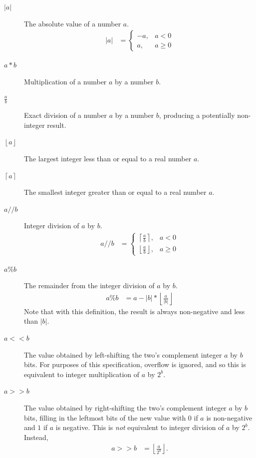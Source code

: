 \documentclass[9pt,letterpaper]{book}
\numberwithin{equation}{chapter}
\numberwithin{figure}{chapter}
\numberwithin{table}{chapter}
\begin{document}
\begin{description}
\item[$|a|$]
The absolute value of a number $a$.
\begin{align*}
|a| & = \left\{\begin{array}{ll}
-a, & a < 0 \\
a, & a \ge 0
\end{array}\right.
\end{align*}

\item[$a*b$]
Multiplication of a number $a$ by a number $b$.
\item[$\frac{a}{b}$]
Exact division of a number $a$ by a number $b$, producing a potentially
 non-integer result.

\item[$\left\lfloor a\right\rfloor$] 
The largest integer less than or equal to a real number $a$.

\item[$\left\lceil a\right\rceil$]
The smallest integer greater than or equal to a real number $a$.

\item[$a//b$]
Integer division of $a$ by $b$.
\begin{align*}
a//b & = \left\{\begin{array}{ll}
\left\lceil\frac{a}{b}\right\rceil, & a < 0 \\
\left\lfloor\frac{a}{b}\right\rfloor, & a \ge 0
\end{array}\right.
\end{align*}

\item[$a\%b$]
The remainder from the integer division of $a$ by $b$.
\begin{align*}
a\%b & = a-|b|*\left\lfloor\frac{a}{|b|}\right\rfloor
\end{align*}
Note that with this definition, the result is always non-negative and less than
 $|b|$.

\item[$a<<b$]
The value obtained by left-shifting the two's complement integer $a$ by $b$
 bits.
For purposes of this specification, overflow is ignored, and so this is
 equivalent to integer multiplication of $a$ by $2^b$.

\item[$a>>b$]
The value obtained by right-shifting the two's complement integer $a$ by $b$
 bits, filling in the leftmost bits of the new value with $0$ if $a$ is
 non-negative and $1$ if $a$ is negative.
This is {\em not} equivalent to integer division of $a$ by $2^b$.
Instead,
\begin{align*}
a>>b & = \left\lfloor\frac{a}{2^b}\right\rfloor.
\end{align*}


\end{description}
\end{document}
